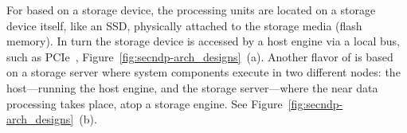 For \csds based on a storage device, the processing units are located on a storage device itself, like an SSD, physically attached to the storage media (flash memory). In turn the storage device is accessed by a host engine via a local bus, such as PCIe~\cite{NGD,eideticom,Samsung},  Figure~\ref{fig:secndp-arch_designs}~(a). %
%
%
%
Another flavor of \csds is based on a storage server where system components execute in two different nodes: the host---running the host engine, and the storage server---where the near data processing takes place, atop a storage engine. See Figure~\ref{fig:secndp-arch_designs}~(b).
